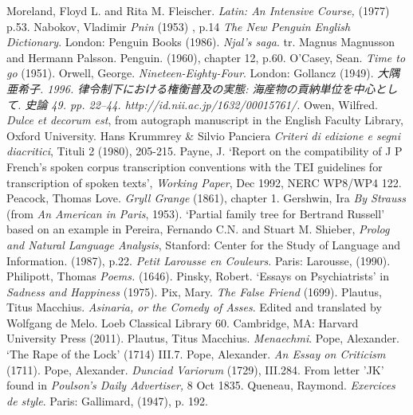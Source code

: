 \begin{bibitemlist}{1}
 Moreland, Floyd L. and Rita M. Fleischer. \textit{Latin: An Intensive Course,} (1977) p.53.
 Nabokov, Vladimir \textit{Pnin} (1953) , p.14 
 \textit{The New Penguin English Dictionary}. London: Penguin Books (1986).
 \textit{Njal's saga}. tr. Magnus Magnusson and Hermann Palsson. Penguin. (1960), chapter 12, p.60.
 O'Casey, Sean. \textit{Time to go} (1951).
 Orwell, George. \textit{Nineteen-Eighty-Four}. London: Gollancz (1949).
 \label{ja-ritsuryo-weights}\textit{大隅亜希子. 1996. 律令制下における権衡普及の実態: 海産物の貢納単位を中心として. 史論 49. pp. 22–44. http://id.nii.ac.jp/1632/00015761/.} Owen, Wilfred. \textit{Dulce et decorum est}, from autograph manuscript in the English Faculty Library, Oxford University.
 Hans Krummrey \& Silvio Panciera \textit{Criteri di edizione e segni diacritici}, Tituli 2 (1980), 205-215.
 Payne, J.  ‘Report on the compatibility of J P French's spoken corpus transcription conventions with the TEI guidelines for transcription of spoken texts’, \textit{Working Paper}, Dec 1992, NERC WP8/WP4 122.
 Peacock, Thomas Love. \textit{Gryll Grange} (1861), chapter 1.
 Gershwin, Ira \textit{By Strauss} (from \textit{An American in Paris}, 1953).
 ‘Partial family tree for Bertrand Russell’ based on an example in Pereira, Fernando C.N. and Stuart M. Shieber, \textit{Prolog and Natural Language Analysis}, Stanford: Center for the Study of Language and Information. (1987), p.22.
 \textit{Petit Larousse en Couleurs}. Paris: Larousse, (1990).
 Philipott, Thomas \textit{Poems.} (1646).
 Pinsky, Robert. ‘Essays on Psychiatrists’ in \textit{Sadness and Happiness} (1975).
 Pix, Mary. \textit{The False Friend} (1699).
 Plautus, Titus Macchius. \textit{Asinaria, or the Comedy of Asses}. Edited and translated by Wolfgang de Melo. Loeb Classical Library 60. Cambridge, MA: Harvard University Press (2011).
 Plautus, Titus Macchius. \textit{Menaechmi}.
 Pope, Alexander. ‘The Rape of the Lock’ (1714) III.7.
 Pope, Alexander. \textit{An Essay on Criticism} (1711).
 Pope, Alexander. \textit{Dunciad Variorum} (1729), III.284.
 From letter 'JK' found in \textit{Poulson's Daily Advertiser,} 8 Oct 1835.
 Queneau, Raymond. \textit{Exercices de style}. Paris: Gallimard, (1947), p. 192.

\end{bibitemlist}

